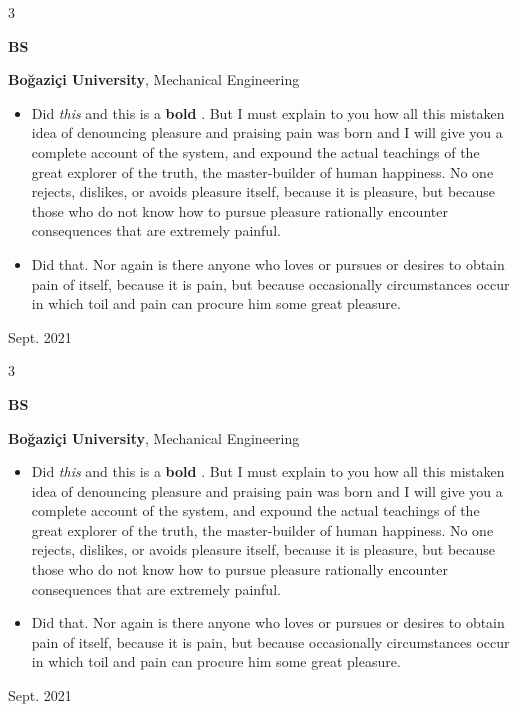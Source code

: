 \documentclass[10pt, letterpaper]{article}
\newenvironment{highlights}{
    \begin{itemize}[
        topsep=0.10 cm,
        parsep=0.10 cm,
        partopsep=0pt,
        itemsep=0pt,
        leftmargin=0.4 cm + 10pt
    ]
}{
    \end{itemize}
} %
\newenvironment{threecolentry}[3][]{
    \onecolentry
    \def\thirdColumn{#3}
    \setcolumnwidth{1 cm, \fill, 4.5 cm}
    \begin{paracol}{3}
    {\raggedright #2} \switchcolumn
}{
    \switchcolumn \raggedleft \thirdColumn
    \end{paracol}
    \endonecolentry
} %
\let\hrefWithoutArrow\href
\renewcommand{\href}[2]{\hrefWithoutArrow{#1}{\mbox{\ifthenelse{\equal{#2}{}}{ }{#2 }\raisebox{.15ex}{\footnotesize \faExternalLink*}}}}
\begin{document}
        \vspace{0.2 cm}

        \begin{threecolentry}{\textbf{BS}}{
            Sept. 2021
        }
            \textbf{Boğaziçi University}, Mechanical Engineering
            \begin{highlights}
                \item Did \textit{this} and this is a \textbf{bold} \href{https://example.com}{link}. But I must explain to you how all this mistaken idea of denouncing pleasure and praising pain was born and I will give you a complete account of the system, and expound the actual teachings of the great explorer of the truth, the master-builder of human happiness. No one rejects, dislikes, or avoids pleasure itself, because it is pleasure, but because those who do not know how to pursue pleasure rationally encounter consequences that are extremely painful.
                \item Did that. Nor again is there anyone who loves or pursues or desires to obtain pain of itself, because it is pain, but because occasionally circumstances occur in which toil and pain can procure him some great pleasure.
            \end{highlights}
        \end{threecolentry}

        \vspace{0.2 cm}

        \begin{threecolentry}{\textbf{BS}}{
            Sept. 2021
        }
            \textbf{Boğaziçi University}, Mechanical Engineering
            \begin{highlights}
                \item Did \textit{this} and this is a \textbf{bold} \href{https://example.com}{link}. But I must explain to you how all this mistaken idea of denouncing pleasure and praising pain was born and I will give you a complete account of the system, and expound the actual teachings of the great explorer of the truth, the master-builder of human happiness. No one rejects, dislikes, or avoids pleasure itself, because it is pleasure, but because those who do not know how to pursue pleasure rationally encounter consequences that are extremely painful.
                \item Did that. Nor again is there anyone who loves or pursues or desires to obtain pain of itself, because it is pain, but because occasionally circumstances occur in which toil and pain can procure him some great pleasure.
            \end{highlights}
        \end{threecolentry}
\end{document}
